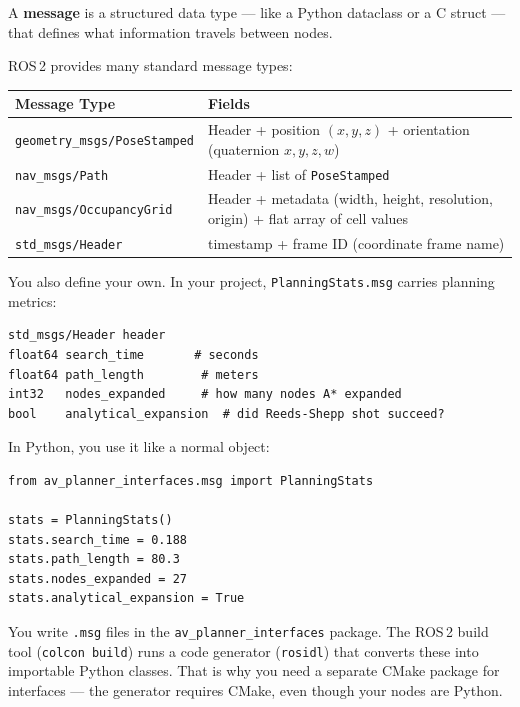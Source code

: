 \documentclass[12pt, a4paper]{article}
\begin{document}
A \textbf{message} is a structured data type --- like a Python dataclass or a
C struct --- that defines what information travels between nodes.

ROS\,2 provides many standard message types:

\begin{center}
\begin{tabular}{lp{8cm}}
    \toprule
    \textbf{Message Type} & \textbf{Fields} \\
    \midrule
    \texttt{geometry\_msgs/PoseStamped} & Header + position $(x, y, z)$ + orientation (quaternion $x, y, z, w$) \\
    \texttt{nav\_msgs/Path} & Header + list of \texttt{PoseStamped} \\
    \texttt{nav\_msgs/OccupancyGrid} & Header + metadata (width, height, resolution, origin) + flat array of cell values \\
    \texttt{std\_msgs/Header} & timestamp + frame ID (coordinate frame name) \\
    \bottomrule
\end{tabular}
\end{center}

You also define your own. In your project, \texttt{PlanningStats.msg} carries
planning metrics:

\begin{lstlisting}[style=msg, caption={msg/PlanningStats.msg}]
std_msgs/Header header
float64 search_time       # seconds
float64 path_length        # meters
int32   nodes_expanded     # how many nodes A* expanded
bool    analytical_expansion  # did Reeds-Shepp shot succeed?
\end{lstlisting}

In Python, you use it like a normal object:

\begin{lstlisting}[style=python, caption={Using a custom message}]
from av_planner_interfaces.msg import PlanningStats

stats = PlanningStats()
stats.search_time = 0.188
stats.path_length = 80.3
stats.nodes_expanded = 27
stats.analytical_expansion = True
\end{lstlisting}

\begin{keybox}
You write \texttt{.msg} files in the \texttt{av\_planner\_interfaces} package.
The ROS\,2 build tool (\texttt{colcon build}) runs a code generator
(\texttt{rosidl}) that converts these into importable Python classes.
That is why you need a separate CMake package for interfaces --- the
generator requires CMake, even though your nodes are Python.
\end{keybox}
\end{document}
